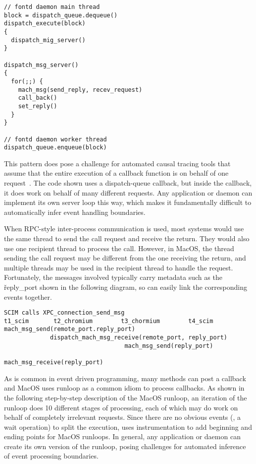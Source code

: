 {\footnotesize \begin{verbatim}
// fontd daemon main thread
block = dispatch_queue.dequeue()
dispatch_execute(block)
{
  dispatch_mig_server()
}

dispatch_msg_server()
{
  for(;;) {
    mach_msg(send_reply, recev_request)
    call_back()
    set_reply()
  }
}

// fontd daemon worker thread
dispatch_queue.enqueue(block)
\end{verbatim}
}

This pattern does pose a challenge for automated causal tracing tools that
assume that the entire execution of a callback function is on behalf of
one request~\cite{xxx}.  The code shown uses a dispatch-queue callback,
but inside the callback, it does work on behalf of many different
requests.  Any application or daemon can implement its  own server loop
this way, which makes it fundamentally difficult to automatically infer
event handling boundaries.

When RPC-style inter-process communication is used, most systems would use
the same thread to send the call request and receive the return.  They
would also use one recipient thread to process the call.  However, in
MacOS, the thread sending the call request may be different from the one
receiving the return, and multiple threads may be used in the recipient
thread to handle the request.  Fortunately, the messages involved
typically carry metadata such as the \v{reply\_port} shown in the
following diagram, so \xxx can easily link the corresponding events
together.

{\footnotesize \begin{verbatim}
SCIM calls XPC_connection_send_msg
t1_scim       t2_chromium        t3_chormium        t4_scim
mach_msg_send(remote_port.reply_port)
             dispatch_mach_msg_receive(remote_port, reply_port)
                                  mach_msg_send(reply_port)
                                                    mach_msg_receive(reply_port)
\end{verbatim}
}

As is common in event driven programming, many methods can post a callback
and MacOS uses runloop as a common idiom to process callbacks.  As shown
in the following step-by-step description of the MacOS runloop, an
iteration of the runloop does 10 different stages of processing, each of
which may do work on behalf of completely irrelevant requests.  Since
there are no obvious events (\eg, a wait operation) to split the
execution, \xxx uses instrumentation to add beginning and ending points
for MacOS runloops.  In general, any application or daemon can create
its own version of the runloop, posing challenges for automated
inference of event processing boundaries.

